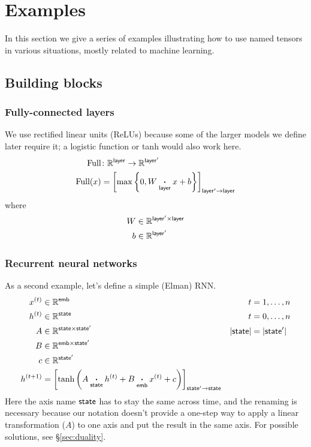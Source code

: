 \documentclass{article}
\newcommand{\reals}{\mathbb{R}}
\begin{document}
\section{Examples}
\label{sec:examples}

In this section we give a series of examples illustrating how to use named tensors in various situations, mostly related to machine learning.

\subsection{Building blocks}

\subsubsection{Fully-connected layers}

We use rectified linear units (ReLUs) because some of the larger models we define later require it; a logistic function or tanh would also work here.
\begin{align*}
  \text{Full} &\colon \reals^{\name{layer}} \rightarrow \reals^{\name{layer'}} \\
  \text{Full}(x) &= \nmov{layer'}{layer}{\max \left\{ 0, W \ndot{layer} x + b \right\}}
\end{align*}
where
\begin{align*}
  W &\in \reals^{\name{layer'} \times \name{layer}} \\
  b &\in \reals^{\name{layer'}} \\
\end{align*}
  
\subsubsection{Recurrent neural networks}
\label{sec:rnn}

As a second example, let's define a simple (Elman) RNN.
\begin{align*}
x^{(t)} &\in \mathbb{R}^{\name{emb}} & t &= 1, \ldots, n \\
h^{(t)} &\in \mathbb{R}^{\name{state}} & t &= 0, \ldots, n\\
A &\in \mathbb{R}^{\name{state} \times \name{state'}} & |\name{state}| &= |\name{state'}| \\
B &\in \mathbb{R}^{\name{emb} \times \name{state'}} \\
c &\in \mathbb{R}^{\name{state'}} \\
h^{(t+1)} &= \nmov{state'}{state}{\tanh\left( A \ndot{state} h^{(t)} + B \ndot{emb} x^{(t)} + c \right)}
\end{align*}
Here the axis name $\name{state}$ has to stay the same across time, and the renaming is necessary because our notation doesn't provide a one-step way to apply a linear transformation ($A$) to one axis and put the result in the same axis. For possible solutions, see \S\ref{sec:duality}.
\end{document}

